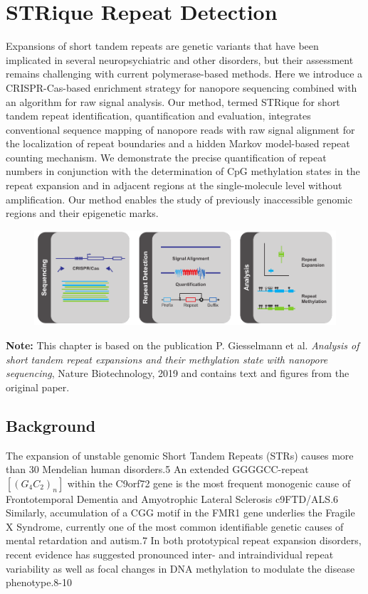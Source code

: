 \chapter{STRique Repeat Detection}
\label{cha:strique}

Expansions of short tandem repeats are genetic variants that have been implicated in several neuropsychiatric and other disorders, but their assessment remains challenging with current polymerase-based methods. Here we introduce a CRISPR-Cas-based enrichment strategy for nanopore sequencing combined with an algorithm for raw signal analysis. Our method, termed STRique for short tandem repeat identification, quantification and evaluation, integrates conventional sequence mapping of nanopore reads with raw signal alignment for the localization of repeat boundaries and a hidden Markov model-based repeat counting mechanism. We demonstrate the precise quantification of repeat numbers in conjunction with the determination of CpG methylation states in the repeat expansion and in adjacent regions at the single-molecule level without amplification. Our method enables the study of previously inaccessible genomic regions and their epigenetic marks.

\begin{figure}[h]
    \centering
    \includegraphics[width=1.0\textwidth]{figures/strique/GA.pdf}
    \label{fig:strique:ga}
\end{figure}

\textbf{Note:} This chapter is based on the publication P. Giesselmann et al. \textit{Analysis of short tandem repeat expansions and their methylation state with nanopore sequencing}, Nature Biotechnology, 2019 and contains text and figures from the original paper.


\section{Background}
\label{sec:strique:background}

The expansion of unstable genomic Short Tandem Repeats (STRs) causes more than 30 Mendelian human disorders.5 An extended GGGGCC-repeat $ [(G_{4}C_{2})_{n}] $ within the C9orf72 gene is the most frequent monogenic cause of Frontotemporal Dementia and Amyotrophic Lateral Sclerosis c9FTD/ALS.6 Similarly, accumulation of a CGG motif in the FMR1 gene underlies the Fragile X Syndrome, currently one of the most common identifiable genetic causes of mental retardation and autism.7 In both prototypical repeat expansion disorders, recent evidence has suggested pronounced inter- and intraindividual repeat variability as well as focal changes in DNA methylation to modulate the disease phenotype.8-10

